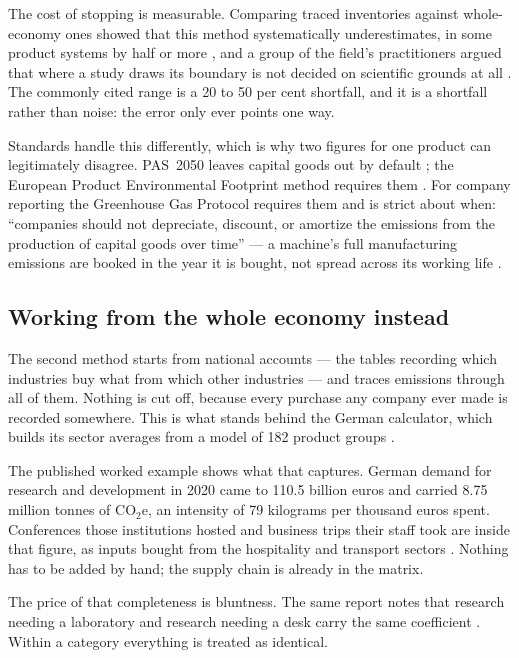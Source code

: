 \documentclass[11pt,a4paper]{article}
\begin{document}
The cost of stopping is measurable. Comparing traced inventories against
whole-economy ones showed that this method systematically underestimates, in some
product systems by half or more \cite{lenzen2000}, and a group of the field's
practitioners argued that where a study draws its boundary is not decided on
scientific grounds at all \cite{suh2004}. The commonly cited range is a 20 to 50
per cent shortfall, and it is a shortfall rather than noise: the error only ever
points one way.

Standards handle this differently, which is why two figures for one product can
legitimately disagree. PAS~2050 leaves capital goods out by default
\cite{pas2050}; the European Product Environmental Footprint method requires them
\cite{pef}. For company reporting the Greenhouse Gas Protocol requires them and is
strict about when: \enquote{companies should not depreciate, discount, or amortize
the emissions from the production of capital goods over time} — a machine's full
manufacturing emissions are booked in the year it is bought, not spread across its
working life \cite{ghgp-scope3}.

\subsection{Working from the whole economy instead}

The second method starts from national accounts — the tables recording which
industries buy what from which other industries — and traces emissions through all
of them. Nothing is cut off, because every purchase any company ever made is
recorded somewhere. This is what stands behind the German calculator, which builds
its sector averages from a model of 182 product groups \cite{uba-rechner}.

The published worked example shows what that captures. German demand for research
and development in 2020 came to 110.5 billion euros and carried 8.75 million tonnes
of CO$_2$e, an intensity of 79 kilograms per thousand euros spent. Conferences those
institutions hosted and business trips their staff took are inside that figure, as
inputs bought from the hospitality and transport sectors \cite{uba-rechner}. Nothing
has to be added by hand; the supply chain is already in the matrix.

The price of that completeness is bluntness. The same report notes that research
needing a laboratory and research needing a desk carry the same coefficient
\cite{uba-rechner}. Within a category everything is treated as identical.
\end{document}
